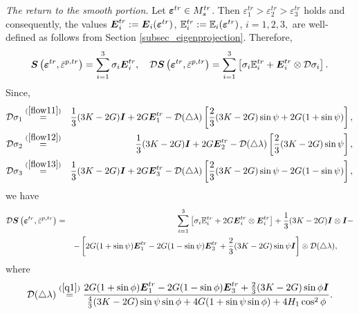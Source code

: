 \documentclass[a4paper,12pt]{article}
\theoremstyle{remark}
\newcommand{\mbf}[1]{\mbox{\boldmath$#1$}}
\numberwithin{equation}{section}
\begin{document}
\bigskip\noindent
{\it The return to the smooth portion.} Let $\mbf{\varepsilon}^{tr}\in M^{tr}_{s}$. Then
$\varepsilon_1^{tr}>\varepsilon_2^{tr}>\varepsilon_3^{tr}$ holds and consequently, the values $\mbf E_i^{tr}:=\mbf E_i(\mbf\varepsilon^{tr})$, $\mathbb E_i^{tr}:=\mathbb E_i(\mbf\varepsilon^{tr})$, $i=1,2,3,$ are well-defined as follows from Section \ref{subsec_eigenprojection}. Therefore,
\begin{equation}
\mbf S\left(\mbf{\varepsilon}^{tr},\bar{\varepsilon}^{p,tr}\right)=\sum_{i=1}^3\sigma_i\mbf E_i^{tr},\quad \mathcal D\mbf S\left(\mbf{\varepsilon}^{tr},\bar{\varepsilon}^{p,tr}\right)=\sum_{i=1}^3\left[\sigma_i\mathbb E_i^{tr}+\mbf E_i^{tr}\otimes\mathcal D\sigma_i\right].
\end{equation}
Since,
\begin{eqnarray*}
\mathcal D\sigma_1&\stackrel{(\ref{flow11})}{=}&\frac{1}{3}(3K-2G)\mbf I+2G\mbf E_1^{tr}-\mathcal D(\triangle\lambda)\left[\frac{2}{3}(3K-2G)\sin\psi+2G(1+\sin\psi)\right],\\
\mathcal D\sigma_2&\stackrel{(\ref{flow12})}{=}&\frac{1}{3}(3K-2G)\mbf I+2G\mbf E_2^{tr}-\mathcal D(\triangle\lambda)\left[\frac{2}{3}(3K-2G)\sin\psi\right],\\
\mathcal D\sigma_3&\stackrel{(\ref{flow13})}{=}&\frac{1}{3}(3K-2G)\mbf I+2G\mbf E_3^{tr}-\mathcal D(\triangle\lambda)\left[\frac{2}{3}(3K-2G)\sin\psi-2G(1-\sin\psi)\right],
\end{eqnarray*}
we have
\begin{eqnarray}
\mathcal D\mbf S\left(\mbf{\varepsilon}^{tr},\bar{\varepsilon}^{p,tr}\right)&=&\sum_{i=1}^3\left[\sigma_i\mathbb E_i^{tr}+2G\mbf E_i^{tr}\otimes\mbf E_i^{tr}\right]+\frac{1}{3}(3K-2G)\mbf I\otimes\mbf I-\nonumber\\
&&-\left[2G(1+\sin\psi)\mbf E_1^{tr}-2G(1-\sin\psi)\mbf E_3^{tr}+\frac{2}{3}(3K-2G)\sin\psi\mbf I\right]\otimes\mathcal D(\triangle\lambda),\qquad
\end{eqnarray}
where 
\begin{equation*}
\mathcal D(\triangle\lambda)\stackrel{(\ref{q1})}{=}\frac{2G(1+\sin\phi)\mbf E_1^{tr}-2G(1-\sin\phi)\mbf E_3^{tr}+\frac{2}{3}(3K-2G)\sin\phi\mbf I}{\frac{4}{3}(3K-2G)\sin\psi\sin\phi+4G(1+\sin\psi\sin\phi)+4H_1\cos^2\phi}.
\end{equation*}
\end{document}
